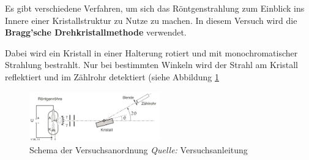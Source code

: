 Es gibt  verschiedene Verfahren, um  sich das R\"ontgenstrahlung  zum Einblick
ins Innere einer  Kristallstruktur zu Nutze zu machen. In  diesem Versuch wird
die \textbf{Bragg'sche Drehkristallmethode} verwendet.

Dabei wird ein  Kristall in einer Halterung rotiert  und mit monochromatischer
Strahlung bestrahlt. Nur  bei bestimmten Winkeln  wird der Strahl  am Kristall
reflektiert und im Z\"ahlrohr detektiert (siehe Abbildung \ref{fig:braggDrehkristall}

\begin{figure}[h!]
    \centering
    \includegraphics[width=0.5\textwidth]{images/bragg-drehkristall.png}
    \caption{%
        Schema der Versuchsanordnung
        \emph{Quelle:} Versuchsanleitung
    }
    \label{fig:braggDrehkristall}
\end{figure}

